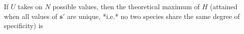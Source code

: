If $U$ takes on $N$ possible values, then the theoretical maximum of $H$
(attained when all values of $\mathbf{s}'$ are unique, *i.e.* no two species
share the same degree of specificity) is
